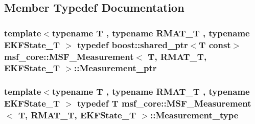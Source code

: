 \subsection{Member Typedef Documentation}
\hypertarget{classmsf__core_1_1MSF__Measurement_afa4f826dadcfd129a50330f078a8dbf8}{
\subsubsection[{Measurement\-\_\-ptr}]{\setlength{\rightskip}{0pt plus 5cm}template$<$typename T , typename R\-M\-A\-T\-\_\-\-T , typename E\-K\-F\-State\-\_\-\-T $>$ typedef boost\-::shared\-\_\-ptr$<$T const$>$ {\bf msf\-\_\-core\-::\-M\-S\-F\-\_\-\-Measurement}$<$ T, R\-M\-A\-T\-\_\-\-T, E\-K\-F\-State\-\_\-\-T $>$\-::{\bf Measurement\-\_\-ptr}}}\label{classmsf__core_1_1MSF__Measurement_afa4f826dadcfd129a50330f078a8dbf8}
\hypertarget{classmsf__core_1_1MSF__Measurement_ab102d2c17bef09be28cb1403017992b6}{
\subsubsection[{Measurement\-\_\-type}]{\setlength{\rightskip}{0pt plus 5cm}template$<$typename T , typename R\-M\-A\-T\-\_\-\-T , typename E\-K\-F\-State\-\_\-\-T $>$ typedef T {\bf msf\-\_\-core\-::\-M\-S\-F\-\_\-\-Measurement}$<$ T, R\-M\-A\-T\-\_\-\-T, E\-K\-F\-State\-\_\-\-T $>$\-::{\bf Measurement\-\_\-type}}}\label{classmsf__core_1_1MSF__Measurement_ab102d2c17bef09be28cb1403017992b6}


